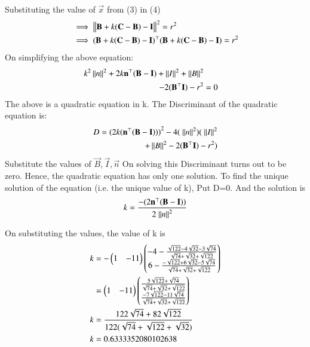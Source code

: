 \documentclass[journal,12pt,twocolumn]{IEEEtran}
\theoremstyle{remark}
\begin{document}
Substituting the value of $ \vec{x} $ from (3) in (4)
\begin{align}
  &\implies\left\lVert \mathbf{B} + k(\mathbf{C}-\mathbf{B})- \mathbf{I} \right\rVert^2 = r^2 \\
  &\implies(\mathbf{B} + k(\mathbf{C}-\mathbf{B})- \mathbf{I})^{\top} (\mathbf{B} + k(\mathbf{C}-\mathbf{B})- \mathbf{I}) = r^2 
\end{align}
On simplifying the above equation:
\begin{align}
\begin{split}
k^2\left\lVert n\right\rVert^2 +2k{\mathbf{n}^{\top}}({\mathbf{B}-\mathbf{I}})+\left\lVert I\right\rVert^2 +\left\lVert B\right\rVert^2\\-2(\mathbf{B}^{\top}\mathbf{I}) - r^2&=0
\end{split}
\end{align}
The above is a quadratic equation in k.
The Discriminant of the quadratic equation is:
\begin{align}
\begin{split}
D = {(2k(\vec{n}^{\top}({\vec{B}-\vec{I}})))}^2-4(\ \norm{n}^2)(\ \norm{I}^2 \\+\norm{B}^2-2(\vec{B}^{\top}\vec{I}) - r^2)
\end{split}
\end{align}
Substitute the values of $\vec{B},\vec{I},\vec{n}$
On solving this Discriminant turns out to be zero.
Hence, the quadratic equation has only one solution.
To find the unique solution of the equation (i.e. the unique value of k), Put D=0.
And the solution is \begin{align}k=\frac{-(2\mathbf{n}^{\top}({\mathbf{B}-\mathbf{I}}))}{2{\ \left\lVert n\right\rVert^2}}\end{align}

On substituting the values, the value of k is 
\begin{align}
k&=-\begin{pmatrix}1&-11\end{pmatrix}\begin{pmatrix}-4-\frac{\sqrt{122}-4\sqrt{32}-3\sqrt{74}}{\sqrt{74}+\sqrt{32}+\sqrt{122}}\\6-\frac{-\sqrt{122}+6\sqrt{32}-5\sqrt{74}}{\sqrt{74}+\sqrt{32}+\sqrt{122}}\end{pmatrix}\nonumber\\
&=\begin{pmatrix}1&-11\end{pmatrix}\begin{pmatrix}\frac{5\sqrt{122}+\sqrt{74}}{\sqrt{74}+\sqrt{32}+\sqrt{122}}\\\frac{-7\sqrt{122}-11\sqrt{74}}{\sqrt{74}+\sqrt{32}+\sqrt{122}}\end{pmatrix}\nonumber\\
k&=\frac{122\sqrt{74}+82\sqrt{122}}{122(\sqrt{74}+\sqrt{122}+\sqrt{32})}\\
k&=0.6333352080102638\nonumber
\end{align}
\end{document}
